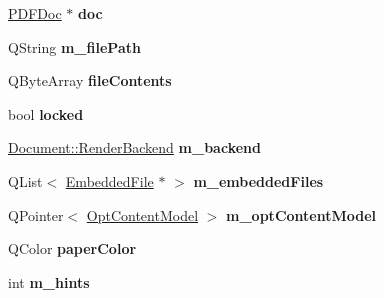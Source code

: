 \begin{DoxyCompactItemize}
\item 
\mbox{\label{class_poppler_1_1_document_data_a93657bc64f38d3c1656edd4938f46088}} 
\hyperlink{class_p_d_f_doc}{P\+D\+F\+Doc} $\ast$ {\bfseries doc}
\item 
\mbox{\label{class_poppler_1_1_document_data_a5b74ab1983f5eb250c020964b9d1215e}} 
Q\+String {\bfseries m\+\_\+file\+Path}
\item 
\mbox{\label{class_poppler_1_1_document_data_a671eb11efb360b9af1daf22cef456c20}} 
Q\+Byte\+Array {\bfseries file\+Contents}
\item 
\mbox{\label{class_poppler_1_1_document_data_a6b06d90552a1af24282749dc86816a47}} 
bool {\bfseries locked}
\item 
\mbox{\label{class_poppler_1_1_document_data_aaaf3ddc468b572a1ec67250ce99990ee}} 
\hyperlink{class_poppler_1_1_document_a4b0a8ab6b6f686c8802a0ad112d48247}{Document\+::\+Render\+Backend} {\bfseries m\+\_\+backend}
\item 
\mbox{\label{class_poppler_1_1_document_data_aa427aaeb6d6508a5c55836717f250a4e}} 
Q\+List$<$ \hyperlink{class_poppler_1_1_embedded_file}{Embedded\+File} $\ast$ $>$ {\bfseries m\+\_\+embedded\+Files}
\item 
\mbox{\label{class_poppler_1_1_document_data_aa377966a08a2346896595113e98054a3}} 
Q\+Pointer$<$ \hyperlink{class_poppler_1_1_opt_content_model}{Opt\+Content\+Model} $>$ {\bfseries m\+\_\+opt\+Content\+Model}
\item 
\mbox{\label{class_poppler_1_1_document_data_aac8c20d13a221433cfabac63cc6fa94e}} 
Q\+Color {\bfseries paper\+Color}
\item 
\mbox{\label{class_poppler_1_1_document_data_ac33bce8bd9bc3aea2a4bf1ba3e69a10c}} 
int {\bfseries m\+\_\+hints}
\end{DoxyCompactItemize}
